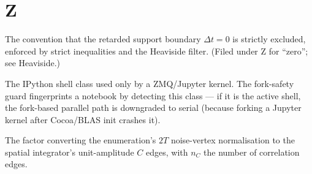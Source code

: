 \section*{Z}
\begin{description}[leftmargin=0pt,style=nextline]

  \item[$\Theta(0)=0$ convention] The convention that the retarded support boundary
        $\Delta t=0$ is strictly excluded, enforced by strict inequalities and the
        Heaviside filter. (Filed under Z for ``zero''; see Heaviside.)

  \item[\code{ZMQInteractiveShell}] The IPython shell class used only by a
        ZMQ/Jupyter kernel. The fork-safety guard fingerprints a notebook by
        detecting this class --- if it is the active shell, the fork-based parallel
        path is downgraded to serial (because forking a Jupyter kernel after
        Cocoa/BLAS init crashes it).

  \item[$2^{-n_C}$ (convention factor)] The factor converting the enumeration's
        $2T$ noise-vertex normalisation to the spatial integrator's unit-amplitude
        $C$ edges, with $n_C$ the number of correlation edges.

\end{description}

